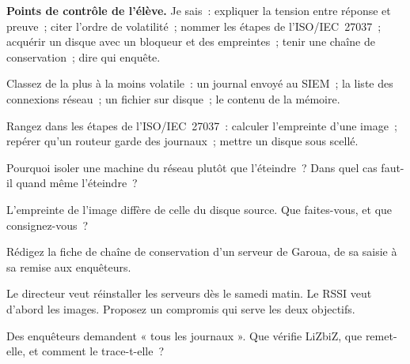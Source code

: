 \begin{boxinfo}
\textbf{Points de contrôle de l'élève.} Je sais~: expliquer la tension
entre réponse et preuve~; citer l'ordre de volatilité~; nommer les étapes
de l'ISO/IEC~27037~; acquérir un disque avec un bloqueur et des
empreintes~; tenir une chaîne de conservation~; dire qui enquête.
\end{boxinfo}

\bigskip

\begin{boxexo}[title={\ding{45}\quad Exercice~24.1. Volatilité \niveaubase}]
Classez de la plus à la moins volatile~: un journal envoyé au SIEM~; la
liste des connexions réseau~; un fichier sur disque~; le contenu de la
mémoire.
\end{boxexo}

\begin{boxexo}[title={\ding{45}\quad Exercice~24.2. Les étapes \niveaubase}]
Rangez dans les étapes de l'ISO/IEC~27037~: calculer l'empreinte d'une
image~; repérer qu'un routeur garde des journaux~; mettre un disque sous
scellé.
\end{boxexo}

\begin{boxexo}[title={\ding{45}\quad Exercice~24.3. Éteindre~? \niveaubase}]
Pourquoi isoler une machine du réseau plutôt que l'éteindre~? Dans quel
cas faut-il quand même l'éteindre~?
\end{boxexo}

\begin{boxexo}[title={\ding{45}\quad Exercice~24.4. L'empreinte \niveaumoyen}]
L'empreinte de l'image diffère de celle du disque source. Que faites-vous,
et que consignez-vous~?
\end{boxexo}

\begin{boxexo}[title={\ding{45}\quad Exercice~24.5. La fiche \niveaumoyen}]
Rédigez la fiche de chaîne de conservation d'un serveur de Garoua, de sa
saisie à sa remise aux enquêteurs.
\end{boxexo}

\begin{boxexo}[title={\ding{45}\quad Exercice~24.6. Réponse et preuve \niveaumoyen}]
Le directeur veut réinstaller les serveurs dès le samedi matin. Le RSSI
veut d'abord les images. Proposez un compromis qui serve les deux
objectifs.
\end{boxexo}

\begin{boxexo}[title={\ding{45}\quad Exercice~24.7. Les enquêteurs \niveaumoyen}]
Des enquêteurs demandent « tous les journaux ». Que vérifie LiZbiZ, que
remet-elle, et comment le trace-t-elle~?
\end{boxexo}

